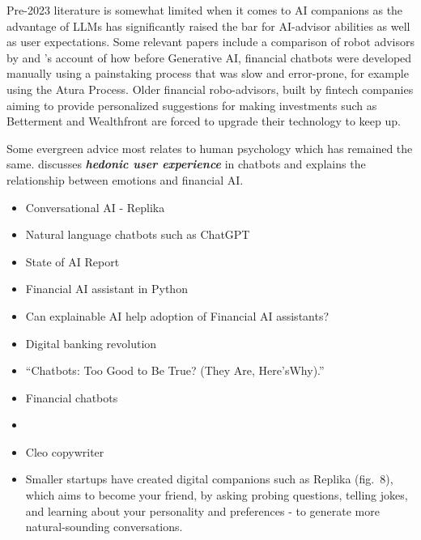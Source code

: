 \documentclass[
  letterpaper,
  DIV=11,
  numbers=noendperiod]{scrartcl}
\begin{document}
Pre-2023 literature is somewhat limited when it comes to AI companions
as the advantage of LLMs has significantly raised the bar for AI-advisor
abilities as well as user expectations. Some relevant papers include a
comparison of robot advisors by \citep{barbarafriedbergM1FinanceVs2021}
and \citep{slackAturaProcess2021}'s account of how before Generative AI,
financial chatbots were developed manually using a painstaking process
that was slow and error-prone, for example using the Atura Process.
Older financial robo-advisors, built by fintech companies aiming to
provide personalized suggestions for making investments such as
Betterment and Wealthfront are forced to upgrade their technology to
keep up.

Some evergreen advice most relates to human psychology which has
remained the same. \citep{haugelandUnderstandingUserExperience2022}
discusses \textbf{\emph{hedonic user experience}} in chatbots and
\citep{stephhayEnoFinancialAI2017} explains the relationship between
emotions and financial AI.

\begin{itemize}
\item
  \citet{eugeniakuydaReplika2023} Conversational AI - Replika
\item
  \citet{greylockOpenAICEOSam2022} Natural language chatbots such as
  ChatGPT
\item
  \citet{nathanbenaichStateAIReport2022} State of AI Report
\item
  \citet{neuralnineFinancialAIAssistant2021} Financial AI assistant in
  Python
\item
  \citet{davidExplainableAIAdoption2021} Can explainable AI help
  adoption of Financial AI assistants?
\item
  \citet{qorusGreatReinventionGlobal2023} Digital banking revolution
\item
  \citet{lowerChatbotsTooGood2017} ``Chatbots: Too Good to Be True?
  (They Are, Here'sWhy).''
\item
  \citet{brownHowFinancialChatbots2021} Financial chatbots
\item
  \citet{isabellaghassemismithInterviewDanielBaeriswyl2019}
\item
  \citet{josephinewaktareheintzCleo} Cleo copywriter
\item
  Smaller startups have created digital companions such as Replika
  (fig.~8), which aims to become your friend, by asking probing
  questions, telling jokes, and learning about your personality and
  preferences - to generate more natural-sounding conversations.
\end{itemize}
\end{document}
